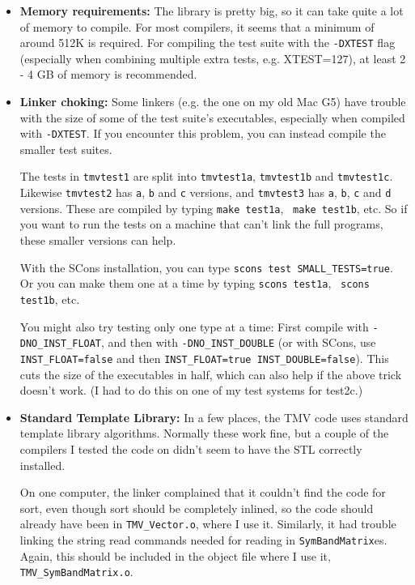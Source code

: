 \documentclass[twoside,letterpaper,11pt]{article}
\renewcommand{\tt}[1]{{\lstinline {#1}}}
\begin{document}
\begin{itemize}
\item {\bf Memory requirements:}
The library is pretty big, so it can take quite a lot of memory to compile. 
For most compilers, it seems that a minimum of around 512K is required.
For compiling the test suite with the \texttt{-DXTEST} flag (especially when combining
multiple extra tests, e.g. XTEST=127), at least 2 - 4 GB of memory is recommended.

\item {\bf Linker choking:}
Some linkers (e.g. the one on my old Mac G5) have trouble with the size 
of some of the test suite's executables, especially when compiled 
with \texttt{-DXTEST}.  If you encounter this problem, you can instead
compile the smaller test suites.  

The tests
in \texttt{tmvtest1} are split into \texttt{tmvtest1a}, \texttt{tmvtest1b} and \texttt{tmvtest1c}.
Likewise \texttt{tmvtest2} has \texttt{a}, \texttt{b} and \texttt{c} versions, and \texttt{tmvtest3}
has \texttt{a}, \texttt{b}, \texttt{c} and \texttt{d} versions.  These are 
compiled by typing \texttt{make test1a},~ \texttt{make test1b}, etc.  So if you want
to run the tests on a machine that can't link the full programs, these
smaller versions can help.   

With the SCons installation, you can 
type \texttt{scons test SMALL\_TESTS=true}.  Or you can make them one
at a time by typing \texttt{scons test1a},~ \texttt{scons test1b}, etc.

You might also try testing only one type at a time: First compile with \texttt{-DNO\_INST\_FLOAT},
and then with \texttt{-DNO\_INST\_DOUBLE} (or with SCons, use \texttt{INST\_FLOAT=false}
and then \texttt{INST\_FLOAT=true INST\_DOUBLE=false}).  This cuts the size of the executables
in half, which can also help if the above trick doesn't work.  (I had to do this on one 
of my test systems for test2c.)

\item {\bf Standard Template Library:}
In a few places, the TMV code uses standard template library algorithms.
Normally these work fine, but a couple of the compilers I tested the code on
didn't seem to have the STL correctly installed. 

On one computer, the linker complained 
that it couldn't find the code for sort, even though sort should be completely inlined,
so the code should already have been in \texttt{TMV\_Vector.o}, where I use it.
Similarly, it had trouble linking the string read commands needed for reading
in \tt{SymBandMatrix}es.  Again, this should be included in the object file where 
I use it, \texttt{TMV\_SymBandMatrix.o}.


\end{itemize}
\end{document}
